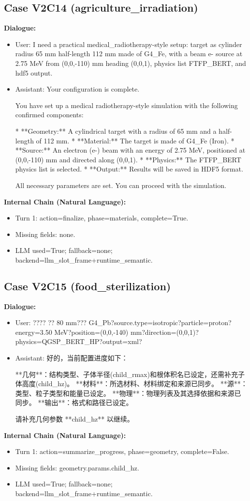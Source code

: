 \documentclass[11pt]{ctexart}
\begin{document}
\subsection{Case V2C14 (agriculture\_irradiation)}
\textbf{Dialogue:}
\begin{itemize}
\item User: I need a practical medical\_radiotherapy-style setup: target as cylinder radius 65 mm half-length 112 mm made of G4\_Fe, with a beam e- source at 2.75 MeV from (0,0,-110) mm heading (0,0,1), physics list FTFP\_BERT, and hdf5 output.
\item Assistant: Your configuration is complete.

You have set up a medical radiotherapy-style simulation with the following confirmed components:

*   **Geometry:** A cylindrical target with a radius of 65 mm and a half-length of 112 mm.
*   **Material:** The target is made of G4\_Fe (Iron).
*   **Source:** An electron (e-) beam with an energy of 2.75 MeV, positioned at (0,0,-110) mm and directed along (0,0,1).
*   **Physics:** The FTFP\_BERT physics list is selected.
*   **Output:** Results will be saved in HDF5 format.

All necessary parameters are set. You can proceed with the simulation.
\end{itemize}
\textbf{Internal Chain (Natural Language):}
\begin{itemize}
\item Turn 1: action=finalize, phase=materials, complete=True.
\item Missing fields: none.
\item LLM used=True; fallback=none; backend=llm\_slot\_frame+runtime\_semantic.
\end{itemize}
\subsection{Case V2C15 (food\_sterilization)}
\textbf{Dialogue:}
\begin{itemize}
\item User: ???? ?? 80 mm??? G4\_Pb?source.type=isotropic?particle=proton?energy=3.50 MeV?position=(0,0,-140) mm?direction=(0,0,1)?physics=QGSP\_BERT\_HP?output=xml?
\item Assistant: 好的，当前配置进度如下：

**几何**：结构类型、子体半径(child\_rmax)和根体积名已设定，还需补充子体高度(child\_hz)。
**材料**：所选材料、材料绑定和来源已同步。
**源**：类型、粒子类型和能量已设定。
**物理**：物理列表及其选择依据和来源已同步。
**输出**：格式和路径已设定。

请补充几何参数 **child\_hz** 以继续。
\end{itemize}
\textbf{Internal Chain (Natural Language):}
\begin{itemize}
\item Turn 1: action=summarize\_progress, phase=geometry, complete=False.
\item Missing fields: geometry.params.child\_hz.
\item LLM used=True; fallback=none; backend=llm\_slot\_frame+runtime\_semantic.
\end{itemize}
\end{document}
